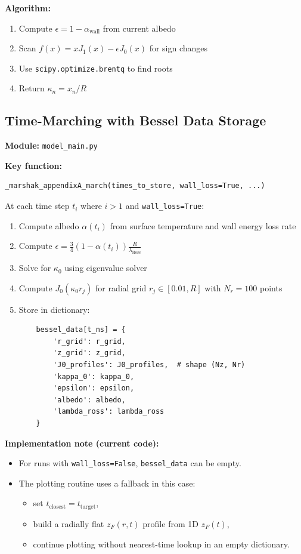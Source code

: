 \documentclass[12pt,a4paper]{article}
\begin{document}
\textbf{Algorithm:}
\begin{enumerate}
    \item Compute $\epsilon = 1 - \alpha_{\text{wall}}$ from current albedo
    \item Scan $f(x) = x J_1(x) - \epsilon J_0(x)$ for sign changes
    \item Use \texttt{scipy.optimize.brentq} to find roots
    \item Return $\kappa_n = x_n / R$
\end{enumerate}

\subsection{Time-Marching with Bessel Data Storage}

\textbf{Module:} \texttt{model\_main.py}

\textbf{Key function:}
\begin{verbatim}
_marshak_appendixA_march(times_to_store, wall_loss=True, ...)
\end{verbatim}

At each time step $t_i$ where $i > 1$ and \texttt{wall\_loss=True}:

\begin{enumerate}
    \item Compute albedo $\alpha(t_i)$ from surface temperature and wall energy loss rate
    \item Compute $\epsilon = \frac{3}{4}(1 - \alpha(t_i))\frac{R}{\lambda_{\text{Ross}}}$
    \item Solve for $\kappa_0$ using eigenvalue solver
    \item Compute $J_0(\kappa_0 r_j)$ for radial grid $r_j \in [0.01, R]$ with $N_r = 100$ points
    \item Store in dictionary:
    \begin{verbatim}
    bessel_data[t_ns] = {
        'r_grid': r_grid,
        'z_grid': z_grid,
        'J0_profiles': J0_profiles,  # shape (Nz, Nr)
        'kappa_0': kappa_0,
        'epsilon': epsilon,
        'albedo': albedo,
        'lambda_ross': lambda_ross
    }
    \end{verbatim}
\end{enumerate}

\textbf{Implementation note (current code):}
\begin{itemize}
    \item For runs with \texttt{wall\_loss=False}, \texttt{bessel\_data} can be empty.
    \item The plotting routine uses a fallback in this case:
    \begin{itemize}
        \item set $t_{\text{closest}} = t_{\text{target}}$,
        \item build a radially flat $z_F(r,t)$ profile from 1D $z_F(t)$,
        \item continue plotting without nearest-time lookup in an empty dictionary.
    \end{itemize}
\end{itemize}
\end{document}
